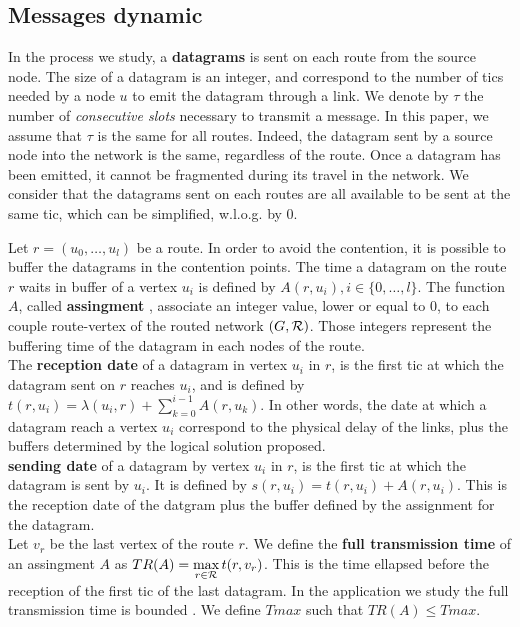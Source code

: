 \documentclass[english]{article}
\begin{document}
 \subsection{Messages dynamic}
	     
        In the process we study, a {\bf datagrams} is sent on each route from the source node. The size of a datagram is an integer, and correspond to the number of tics needed by a node $u$ to emit the datagram through a link.  We denote by $\tau$ the number of \emph{consecutive slots} necessary to transmit a message. In this paper, we assume that $\tau$ is the same for all routes. Indeed, the datagram sent by a source node into the network is the same, regardless of the route. Once a datagram has been emitted, it cannot be fragmented during its travel in the network. We consider that the datagrams sent on each routes are all available to be sent at the same tic, which can be simplified, w.l.o.g. by $0$.
      
        
          Let $r=(u_0,\dots,u_l)$ be a route. In order to avoid the contention, it is possible to buffer the datagrams in the contention points. The time a datagram on the route $r$ waits in buffer of a vertex $u_i$ is defined by $A(r,u_i), i \in \{0,\ldots,l\}$.
          The function $A$, called \textbf{assingment} , associate an integer value, lower or equal to $0$, to each couple route-vertex of the routed network $(G,{\cal R})$. Those integers represent the buffering time of the datagram in each nodes of the route.\\
       

 The \textbf{reception date} of a datagram in vertex $u_i$ in $r$, is the first tic at which the datagram sent on $r$ reaches $u_i$, and is defined by $t(r,u_i) = \lambda(u_i,r) + \sum_{k=0}^{i-1} A(r,u_k) $. In other words, the date at which a datagram reach a vertex $u_i$ correspond to the physical delay of the links, plus the buffers determined by the logical solution proposed.\\
 \textbf{sending date} of a datagram by vertex $u_i$ in $r$, is the first tic at which the datagram is sent by $u_i$. It is defined by $s(r,u_i) = t(r,u_i) +  A(r,u_i) $. This is the reception date of the datgram plus the buffer defined by the assignment for the datagram.\\
 
  Let $v_r$ be the last vertex of the route $r$.
       We define the \textbf{full transmission time} of an assingment $A$ as $TR(A) = \displaystyle \max\limits_{r \in {\cal R}} t(r,v_r) $. This is the time ellapsed before the reception of the first tic of the last datagram.
         In the application we study the full transmission time is bounded . We define $Tmax$ such that $TR(A) \leq Tmax$.
         
\end{document}
